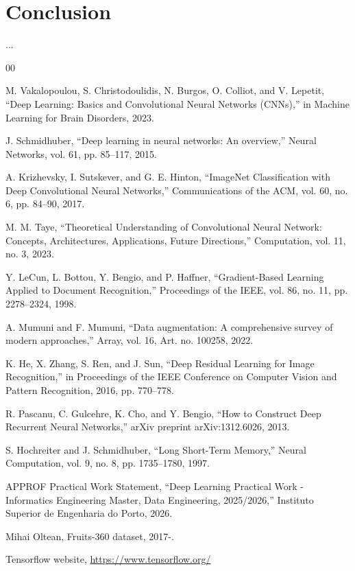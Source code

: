\documentclass[conference]{IEEEtran}
\begin{document}
 
\section{Conclusion}

...

\begin{thebibliography}{00}

M. Vakalopoulou, S. Christodoulidis, N. Burgos, O. Colliot, and V. Lepetit, “Deep Learning: Basics and Convolutional Neural Networks (CNNs),” in Machine Learning for Brain Disorders, 2023.

J. Schmidhuber, “Deep learning in neural networks: An overview,” Neural Networks, vol. 61, pp. 85–117, 2015.

A. Krizhevsky, I. Sutskever, and G. E. Hinton, “ImageNet Classification with Deep Convolutional Neural Networks,” Communications of the ACM, vol. 60, no. 6, pp. 84–90, 2017.

M. M. Taye, “Theoretical Understanding of Convolutional Neural Network: Concepts, Architectures, Applications, Future Directions,” Computation, vol. 11, no. 3, 2023.

Y. LeCun, L. Bottou, Y. Bengio, and P. Haffner, “Gradient-Based Learning Applied to Document Recognition,” Proceedings of the IEEE, vol. 86, no. 11, pp. 2278–2324, 1998.

A. Mumuni and F. Mumuni, “Data augmentation: A comprehensive survey of modern approaches,” Array, vol. 16, Art. no. 100258, 2022.

K. He, X. Zhang, S. Ren, and J. Sun, “Deep Residual Learning for Image Recognition,” in Proceedings of the IEEE Conference on Computer Vision and Pattern Recognition, 2016, pp. 770–778.

R. Pascanu, C. Gulcehre, K. Cho, and Y. Bengio, “How to Construct Deep Recurrent Neural Networks,” arXiv preprint arXiv:1312.6026, 2013.

S. Hochreiter and J. Schmidhuber, “Long Short-Term Memory,” Neural Computation, vol. 9, no. 8, pp. 1735–1780, 1997.

APPROF Practical Work Statement, “Deep Learning Practical Work - Informatics Engineering Master, Data Engineering, 2025/2026,” Instituto Superior de Engenharia do Porto, 2026.

Mihai Oltean, Fruits-360 dataset, 2017-.

Tensorflow website, \url{https://www.tensorflow.org/}

\end{thebibliography}
\end{document}
